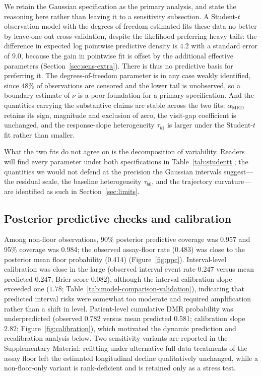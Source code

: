 \documentclass[11pt]{article}
\begin{document}
We retain the Gaussian specification as the primary analysis, and state the
reasoning here rather than leaving it to a sensitivity subsection. A
Student-$t$ observation model with the degrees of freedom estimated fits these
data no better by leave-one-out cross-validation, despite the likelihood
preferring heavy tails: the difference in expected log pointwise predictive
density is $4.2$ with a standard error of $9.0$, because the gain in pointwise
fit is offset by the additional effective parameters
(Section~\ref{sec:sens-extra}). There is thus no predictive basis for preferring
it. The degrees-of-freedom parameter is
in any case weakly identified, since $48\%$ of observations are censored and the
lower tail is unobserved, so a boundary estimate of $\nu$ is a poor foundation
for a primary specification. And the quantities carrying the substantive claims
are stable across the two fits: $\alpha_{\mathrm{MRD}}$ retains its sign,
magnitude and exclusion of zero, the visit-gap coefficient is unchanged, and the
response-slope heterogeneity $\tau_{b1}$ is larger under the Student-$t$ fit
rather than smaller.

What the two fits do not agree on is the decomposition of variability. Readers
will find every parameter under both specifications in
Table~\ref{tab:studentt}; the quantities we would not defend at the precision
the Gaussian intervals suggest---the residual scale, the baseline heterogeneity
$\tau_{b0}$, and the trajectory curvature---are identified as such in
Section~\ref{sec:limits}.



\subsection{Posterior predictive checks and calibration}
\label{sec:ppc}
\label{sec:ppc-calibration}

Among non-floor observations, 90\% posterior predictive coverage was 0.957
and 95\% coverage was 0.984; the observed assay-floor rate (0.483) was
close to the posterior mean floor probability (0.414)
(Figure~\ref{fig:ppc}). Interval-level
calibration was close in the large (observed interval event rate 0.247
versus mean predicted 0.247, Brier score 0.082), although the interval
calibration slope exceeded one ($1.78$; Table~\ref{tab:model-comparison-validation}),
indicating that predicted interval risks were somewhat too moderate and
required amplification rather than a shift in level. Patient-level cumulative
DMR probability was underpredicted (observed 0.782 versus mean predicted
0.581; calibration slope $2.82$; Figure~\ref{fig:calibration}), which
motivated the dynamic prediction and recalibration analysis below. Two
sensitivity variants are reported in the Supplementary Material: refitting
under alternative full-data treatments of the assay floor left the estimated
longitudinal decline qualitatively unchanged, while a non-floor-only variant
is rank-deficient and is retained only as a stress test.
\end{document}

